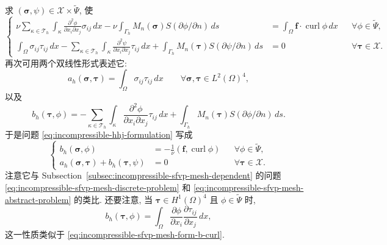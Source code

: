 求 $(\boldsymbol\sigma,\psi)\in\mathcal X\times\widetilde\Psi$, 使
\begin{equation}\label{eq:incompressible-hhj-formulation}
\left\{
\begin{aligned}
\nu\sum_{\kappa\in\mathcal T_h}
\int_\kappa\frac{\partial^2\phi}{\partial x_i\partial x_j}
\sigma_{ij}\,dx
-\nu\int_{\Gamma_h}M_n(\boldsymbol\sigma)
S(\partial\phi/\partial n)\,ds
&=\int_\Omega\mathbf f\cdot\operatorname{curl}\phi\,dx
&&\forall\phi\in\widetilde\Psi,\\
\int_\Omega\sigma_{ij}\tau_{ij}\,dx
-\sum_{\kappa\in\mathcal T_h}
\int_\kappa\frac{\partial^2\psi}{\partial x_i\partial x_j}
\tau_{ij}\,dx
+\int_{\Gamma_h}M_n(\boldsymbol\tau)
S(\partial\psi/\partial n)\,ds
&=0
&&\forall\boldsymbol\tau\in\mathcal X.
\end{aligned}
\right.
\end{equation}
再次可用两个双线性形式表述它:
\begin{equation}\label{eq:incompressible-hhj-form-a}
a_h(\boldsymbol\sigma,\boldsymbol\tau)
=\int_\Omega\sigma_{ij}\tau_{ij}\,dx
\qquad\forall\boldsymbol\sigma,\boldsymbol\tau\in L^2(\Omega)^4,
\end{equation}
以及
\begin{equation}\label{eq:incompressible-hhj-form-b}
b_h(\boldsymbol\tau,\phi)
=-\sum_{\kappa\in\mathcal T_h}
\int_\kappa\frac{\partial^2\phi}{\partial x_i\partial x_j}
\tau_{ij}\,dx
+\int_{\Gamma_h}M_n(\boldsymbol\tau)
S(\partial\phi/\partial n)\,ds.
\end{equation}
于是问题 \eqref{eq:incompressible-hhj-formulation} 写成
\begin{equation}\label{eq:incompressible-hhj-abstract-formulation}
\left\{
\begin{aligned}
b_h(\boldsymbol\sigma,\phi)
&=-\frac1\nu(\mathbf f,\operatorname{curl}\phi)
&&\forall\phi\in\widetilde\Psi,\\
a_h(\boldsymbol\sigma,\boldsymbol\tau)
+b_h(\boldsymbol\tau,\psi)&=0
&&\forall\boldsymbol\tau\in\mathcal X.
\end{aligned}
\right.
\end{equation}
注意它与 Subsection~\ref{subsec:incompressible-sfvp-mesh-dependent}
的问题 \eqref{eq:incompressible-sfvp-mesh-discrete-problem}
和 \eqref{eq:incompressible-sfvp-mesh-abstract-problem} 的类比.
还要注意, 当 $\boldsymbol\tau\in H^1(\Omega)^4$
且 $\phi\in\widetilde\Psi$ 时,
\begin{equation}\label{eq:incompressible-hhj-form-b-gradient}
b_h(\boldsymbol\tau,\phi)
=\int_\Omega
\frac{\partial\phi}{\partial x_i}
\frac{\partial\tau_{ij}}{\partial x_j}\,dx,
\end{equation}
这一性质类似于
\eqref{eq:incompressible-sfvp-mesh-form-b-curl}.

